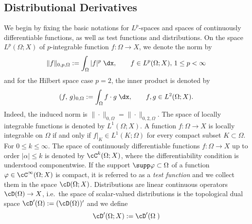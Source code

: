 \subsection{Distributional Derivatives}
We begin by fixing the basic notations for $L^p$-spaces and spaces of continuously differentiable functions, as well as test functions and distributions. On the space $L^p(\Omega;X)$ of $p$-integrable function $f:\Omega\to X$, we denote the norm by
\begin{equation*}
	\|f\|_{0,p,\Omega}:= \int_\Omega |f|^p\;\dx,\qquad f\in L^p(\Omega;X),\, 1\le p<\infty
\end{equation*}
and for the Hilbert space case $p = 2$, the inner product is denoted by
\begin{equation*}
	(f,\, g)_{0,\Omega}:= \int_\Omega f\cdot g\;\dx,\qquad f,g\in L^2(\Omega;X).
\end{equation*}
Indeed, the induced norm is $\|\cdot\|_{0,\Omega} = \|\cdot\|_{0,2,\Omega}$. The space of locally integrable functions is denoted by $L^1(\Omega;X)$. A function $f:\Omega\to X$ is locally integrable on $\Omega$ if and only if $f|_K\in L^1(K;\Omega)$ for every compact subset $K\subset \Omega$. For $0\le k\le \infty$. The space of continuously differentiable functions $f:\Omega\to X$ up to order $|\alpha|\le k$ is denoted by $\cC^k(\Omega;X)$, where the differentiability condition is understood componentwise. If the support $\supp\varphi\subset \Omega$ of a function $\varphi\in\cC^\infty(\Omega;X)$ is compact, it is referred to as a {\em test function} and we collect them in the space $\cD(\Omega;X)$. Distributions are linear continuous operators $\cD(\Omega)\to X$, i.e.\ the space of scalar-valued distributions is the topological dual space $\cD^\prime(\Omega):= (\cD(\Omega))^\prime$ and we define
\begin{equation}
    \cD^\prime(\Omega;X):= \cD^\prime(\Omega\;)
\end{equation}